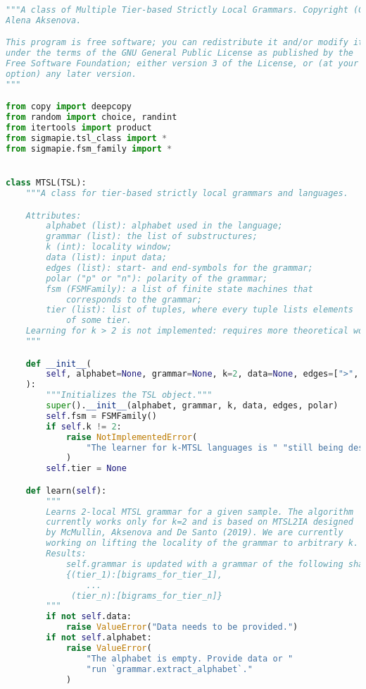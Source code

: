 \begin{lstlisting}[language=Python]
"""A class of Multiple Tier-based Strictly Local Grammars. Copyright (C) 2019
Alena Aksenova.

This program is free software; you can redistribute it and/or modify it
under the terms of the GNU General Public License as published by the
Free Software Foundation; either version 3 of the License, or (at your
option) any later version.
"""

from copy import deepcopy
from random import choice, randint
from itertools import product
from sigmapie.tsl_class import *
from sigmapie.fsm_family import *


class MTSL(TSL):
    """A class for tier-based strictly local grammars and languages.

    Attributes:
        alphabet (list): alphabet used in the language;
        grammar (list): the list of substructures;
        k (int): locality window;
        data (list): input data;
        edges (list): start- and end-symbols for the grammar;
        polar ("p" or "n"): polarity of the grammar;
        fsm (FSMFamily): a list of finite state machines that
            corresponds to the grammar;
        tier (list): list of tuples, where every tuple lists elements
            of some tier.
    Learning for k > 2 is not implemented: requires more theoretical work.
    """

    def __init__(
        self, alphabet=None, grammar=None, k=2, data=None, edges=[">", "<"], polar="p"
    ):
        """Initializes the TSL object."""
        super().__init__(alphabet, grammar, k, data, edges, polar)
        self.fsm = FSMFamily()
        if self.k != 2:
            raise NotImplementedError(
                "The learner for k-MTSL languages is " "still being designed."
            )
        self.tier = None

    def learn(self):
        """
        Learns 2-local MTSL grammar for a given sample. The algorithm 
        currently works only for k=2 and is based on MTSL2IA designed 
        by McMullin, Aksenova and De Santo (2019). We are currently
        working on lifting the locality of the grammar to arbitrary k.
        Results:
            self.grammar is updated with a grammar of the following shape:
            {(tier_1):[bigrams_for_tier_1],
                ...
             (tier_n):[bigrams_for_tier_n]}
        """
        if not self.data:
            raise ValueError("Data needs to be provided.")
        if not self.alphabet:
            raise ValueError(
                "The alphabet is empty. Provide data or "
                "run `grammar.extract_alphabet`."
            )


\end{lstlisting}
